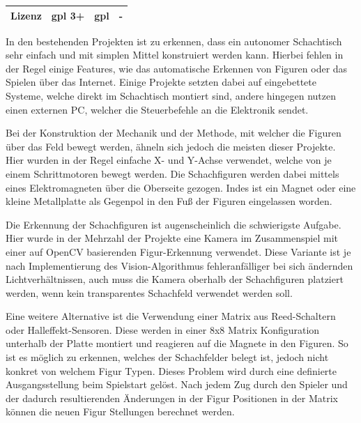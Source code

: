 \begin{longtable}[]{@{}lccr@{}}
\begin{minipage}[t]{0.19\columnwidth}\raggedright
Lizenz\strut
\end{minipage} & \begin{minipage}[t]{0.25\columnwidth}\centering
\gls{gpl} 3+\strut
\end{minipage} & \begin{minipage}[t]{0.26\columnwidth}\centering
\gls{gpl}\strut
\end{minipage} & \begin{minipage}[t]{0.19\columnwidth}\raggedleft
-\strut
\end{minipage}\tabularnewline
\bottomrule
\end{longtable}

In den bestehenden Projekten ist zu erkennen, dass ein autonomer
Schachtisch sehr einfach und mit simplen Mittel konstruiert werden kann.
Hierbei fehlen in der Regel einige Features, wie das automatische
Erkennen von Figuren oder das Spielen über das Internet. Einige Projekte
setzten dabei auf eingebettete Systeme, welche direkt im Schachtisch
montiert sind, andere hingegen nutzen einen externen PC, welcher die
Steuerbefehle an die Elektronik sendet.

Bei der Konstruktion der Mechanik und der Methode, mit welcher die
Figuren über das Feld bewegt werden, ähneln sich jedoch die meisten
dieser Projekte. Hier wurden in der Regel einfache X- und Y-Achse
verwendet, welche von je einem Schrittmotoren bewegt werden. Die
Schachfiguren werden dabei mittels eines Elektromagneten über die
Oberseite gezogen. Indes ist ein Magnet oder eine kleine Metallplatte
als Gegenpol in den Fuß der Figuren eingelassen worden.

Die Erkennung der Schachfiguren ist augenscheinlich die schwierigste
Aufgabe. Hier wurde in der Mehrzahl der Projekte eine Kamera im
Zusammenspiel mit einer auf OpenCV basierenden Figur-Erkennung
verwendet. Diese Variante ist je nach Implementierung des
Vision-Algorithmus fehleranfälliger bei sich ändernden
Lichtverhältnissen, auch muss die Kamera oberhalb der Schachfiguren
platziert werden, wenn kein transparentes Schachfeld verwendet werden
soll.

Eine weitere Alternative ist die Verwendung einer Matrix aus
Reed-Schaltern oder Halleffekt-Sensoren. Diese werden in einer 8x8
Matrix Konfiguration unterhalb der Platte montiert und reagieren auf die
Magnete in den Figuren. So ist es möglich zu erkennen, welches der
Schachfelder belegt ist, jedoch nicht konkret von welchem Figur Typen.
Dieses Problem wird durch eine definierte Ausgangsstellung beim
Spielstart gelöst. Nach jedem Zug durch den Spieler und der dadurch
resultierenden Änderungen in der Figur Positionen in der Matrix können
die neuen Figur Stellungen berechnet werden.

